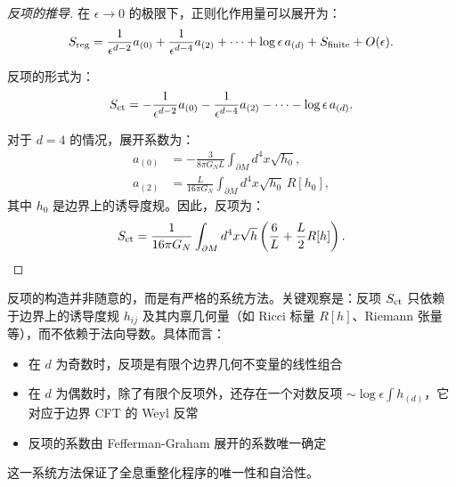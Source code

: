 \begin{proof}[反项的推导]
在 $\epsilon \to 0$ 的极限下，正则化作用量可以展开为：
\begin{equation}
    S_{\rm reg} = \frac{1}{\epsilon^{d-2}} a_{(0)} + \frac{1}{\epsilon^{d-4}} a_{(2)} + \cdots + \log\epsilon \, a_{(d)} + S_{\rm finite} + O(\epsilon).
\end{equation}

反项的形式为：
\begin{equation}
    S_{\rm ct} = -\frac{1}{\epsilon^{d-2}} a_{(0)} - \frac{1}{\epsilon^{d-4}} a_{(2)} - \cdots - \log\epsilon \, a_{(d)}.
\end{equation}

对于 $d=4$ 的情况，展开系数为：
\begin{align}
    a_{(0)} &= -\frac{3}{8\pi G_N L} \int_{\partial M} d^4 x \sqrt{h_0}, \\
    a_{(2)} &= \frac{L}{16\pi G_N} \int_{\partial M} d^4 x \sqrt{h_0} \, R[h_0],
\end{align}
其中 $h_0$ 是边界上的诱导度规。因此，反项为：
\begin{equation}
    S_{\rm ct} = \frac{1}{16\pi G_N} \int_{\partial M} d^4 x \sqrt{h} \left( \frac{6}{L} + \frac{L}{2} R[h] \right).
\end{equation}
\end{proof}

\begin{remark}[反项构造的系统方法]
反项的构造并非随意的，而是有严格的系统方法\cite{Skenderis2002}。关键观察是：反项 $S_{\rm ct}$ 只依赖于边界上的诱导度规 $h_{ij}$ 及其内禀几何量（如 Ricci 标量 $R[h]$、Riemann 张量等），而不依赖于法向导数。具体而言：
\begin{itemize}
    \item 在 $d$ 为奇数时，反项是有限个边界几何不变量的线性组合
    \item 在 $d$ 为偶数时，除了有限个反项外，还存在一个对数反项 $\sim \log\epsilon \int h_{(d)}$，它对应于边界 CFT 的 Weyl 反常\cite{Henningson1998}
    \item 反项的系数由 Fefferman-Graham 展开的系数唯一确定
\end{itemize}
这一系统方法保证了全息重整化程序的唯一性和自洽性。
\end{remark}

